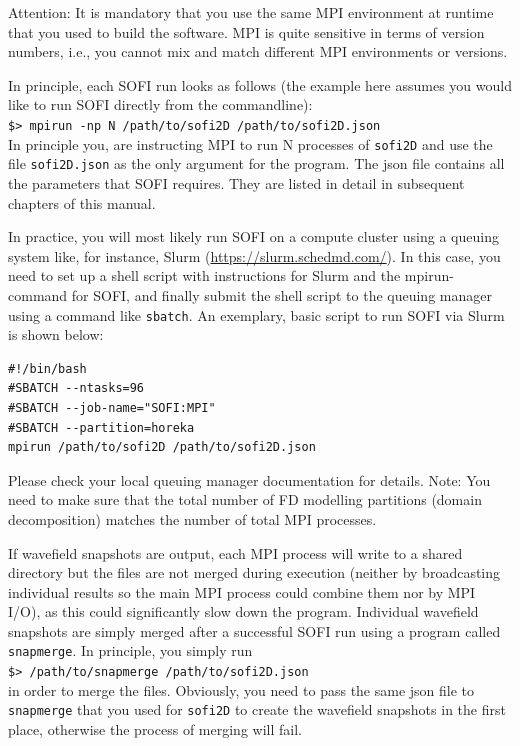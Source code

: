 \documentclass[11pt,english,a4paper]{article}
\newcommand{\RET}{\raisebox{2pt}{\scalebox{0.8}{\Return}}}
\begin{document}
Attention: It is mandatory that you use the same MPI environment at runtime that you used to build the software. MPI is quite sensitive in terms of version numbers, i.e., you cannot mix and match different MPI environments or versions.

In principle, each SOFI run looks as follows (the example here assumes you would like to run SOFI directly from the commandline):\\
\verb+$> mpirun -np N /path/to/sofi2D /path/to/sofi2D.json+\RET{}\\
In principle you, are instructing MPI to run N processes of \texttt{sofi2D} and use the file \texttt{sofi2D.json} as the only argument for the program. The json file contains all the parameters that SOFI requires. They are listed in detail in subsequent chapters of this manual.

In practice, you will most likely run SOFI on a compute cluster using a queuing system like, for instance, Slurm (\url{https://slurm.schedmd.com/}). In this case, you need to set up a shell script with instructions for Slurm and the mpirun-command for SOFI, and finally submit the shell script to the queuing manager using a command like \texttt{sbatch}. An exemplary, basic script to run SOFI via Slurm is shown below:
\begin{verbatim}
#!/bin/bash
#SBATCH --ntasks=96
#SBATCH --job-name="SOFI:MPI"
#SBATCH --partition=horeka
mpirun /path/to/sofi2D /path/to/sofi2D.json
\end{verbatim}
Please check your local queuing manager documentation for details. Note: You need to make sure that the total number of FD modelling partitions (domain decomposition) matches the number of total MPI processes.

If wavefield snapshots are output, each MPI process will write to a shared directory but the files are not merged during execution (neither by broadcasting individual results so the main MPI process could combine them nor by MPI I/O), as this could significantly slow down the program. Individual wavefield snapshots are simply merged after a successful SOFI run using a program called \texttt{snapmerge}. In principle, you simply run\\
\verb+$> /path/to/snapmerge /path/to/sofi2D.json+\RET{}\\
in order to merge the files. Obviously, you need to pass the same json file to \texttt{snapmerge} that you used for \texttt{sofi2D} to create the wavefield snapshots in the first place, otherwise the process of merging will fail.
\end{document}
